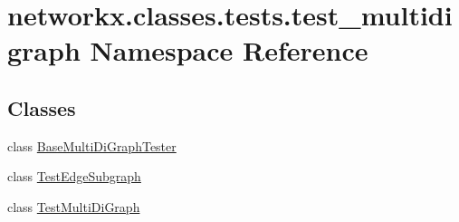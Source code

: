 \hypertarget{namespacenetworkx_1_1classes_1_1tests_1_1test__multidigraph}{}\section{networkx.\+classes.\+tests.\+test\+\_\+multidigraph Namespace Reference}
\label{namespacenetworkx_1_1classes_1_1tests_1_1test__multidigraph}
\subsection*{Classes}
\begin{DoxyCompactItemize}
\item 
class \hyperlink{classnetworkx_1_1classes_1_1tests_1_1test__multidigraph_1_1BaseMultiDiGraphTester}{Base\+Multi\+Di\+Graph\+Tester}
\item 
class \hyperlink{classnetworkx_1_1classes_1_1tests_1_1test__multidigraph_1_1TestEdgeSubgraph}{Test\+Edge\+Subgraph}
\item 
class \hyperlink{classnetworkx_1_1classes_1_1tests_1_1test__multidigraph_1_1TestMultiDiGraph}{Test\+Multi\+Di\+Graph}
\end{DoxyCompactItemize}
